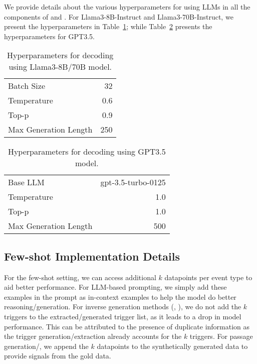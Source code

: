 We provide details about the various hyperparameters for using LLMs in all the components of \starName{} and \modelName.
For Llama3-8B-Instruct and Llama3-70B-Instruct, we present the hyperparameters in Table~\ref{tab:hyper-llama}; while Table~\ref{tab:hyper-gpt} presents the hyperparameters for GPT3.5.

\begin{table}[h]
    \centering
    \small
    \begin{tabular}{lr}
        \toprule
        Batch Size & 32 \\
        Temperature & 0.6 \\
        Top-p & 0.9 \\
        Max Generation Length & 250 \\
        \bottomrule
    \end{tabular}
    \caption{Hyperparameters for decoding using Llama3-8B/70B model.}
    \label{tab:hyper-llama}
\end{table}

\begin{table}[h]
    \centering
    \small
    \begin{tabular}{lr}
        \toprule
        Base LLM & gpt-3.5-turbo-0125 \\
        Temperature & 1.0 \\
        Top-p & 1.0 \\
        Max Generation Length & 500 \\
        \bottomrule
    \end{tabular}
    \caption{Hyperparameters for decoding using GPT3.5 model.}
    \label{tab:hyper-gpt}
\end{table}

\subsection{Few-shot Implementation Details}

For the few-shot setting, we can access additional $k$ datapoints per event type to aid better performance.
For LLM-based prompting, we simply add these examples in the prompt as in-context examples to help the model do better reasoning/generation.
For inverse generation methods (\starName, \modelName), we do not add the $k$ triggers to the extracted/generated trigger list, as it leads to a drop in model performance.
This can be attributed to the presence of duplicate information as the trigger generation/extraction already accounts for the $k$ triggers.
For passage generation/\extracttrain, we append the $k$ datapoints to the synthetically generated data to provide signals from the gold data.

